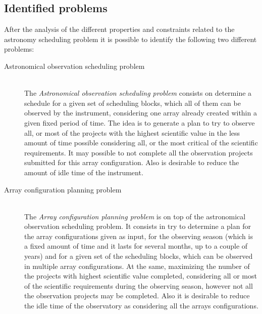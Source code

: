 \subsection{Identified problems}
\label{sec:problems}
After the analysis of the different properties and constraints related to the astronomy scheduling problem it is possible to identify the following two different problems:
\begin{description}

\item[Astronomical observation scheduling problem] \hfill \\
The \textit{Astronomical observation scheduling problem} consists on determine a schedule for a given set of scheduling blocks, which all of them can be observed by the instrument, considering one array already created within a given fixed period of time. 
The idea is to generate a plan to try to observe all, or most of the projects with the highest scientific value in the less amount of time possible considering all, or the most critical of the scientific requirements. It may possible to not complete all the observation projects submitted for this array configuration. Also is desirable to reduce the amount of idle time of the instrument.

\item[Array configuration planning problem] \hfill \\
The \textit{Array configuration planning problem} is on top of the astronomical observation scheduling problem. It consists in try to determine a plan for the array configurations given as input, for the observing season (which is a fixed amount of time and it lasts for several months, up to a couple of years) and for a given set of the scheduling blocks, which can be observed in multiple array configurations. At the same, maximizing the number of the projects with highest scientific value completed, considering all or most of the scientific requirements during the observing season, however not all the observation projects may be completed. Also it is desirable to reduce the idle time of the observatory as considering all the arrays configurations.
\end{description}


